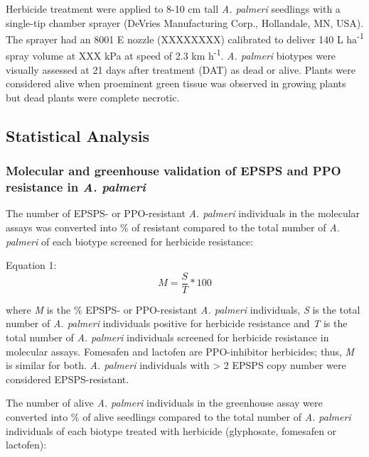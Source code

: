 \documentclass[10pt,letterpaper]{article}
\begin{document}
Herbicide treatment were applied to 8-10 cm tall \emph{A. palmeri}
seedlings with a single-tip chamber sprayer (DeVries Manufacturing
Corp., Hollandale, MN, USA). The sprayer had an 8001 E nozzle (XXXXXXXX)
calibrated to deliver 140 L ha\textsuperscript{-1} spray volume at XXX
kPa at speed of 2.3 km h\textsuperscript{-1}. \emph{A. palmeri} biotypes
were visually assessed at 21 days after treatment (DAT) as dead or
alive. Plants were considered alive when proeminent green tissue was
observed in growing plants but dead plants were complete necrotic.

\hypertarget{statistical-analysis}{%
\subsection{Statistical Analysis}\label{statistical-analysis}}

\hypertarget{molecular-and-greenhouse-validation-of-epsps-and-ppo-resistance-in-a.-palmeri}{%
\subsubsection{\texorpdfstring{Molecular and greenhouse validation of
EPSPS and PPO resistance in \emph{A.
palmeri}}{Molecular and greenhouse validation of EPSPS and PPO resistance in A. palmeri}}\label{molecular-and-greenhouse-validation-of-epsps-and-ppo-resistance-in-a.-palmeri}}

The number of EPSPS- or PPO-resistant \emph{A. palmeri} individuals in
the molecular assays was converted into \% of resistant compared to the
total number of \emph{A. palmeri} of each biotype screened for herbicide
resistance:

Equation 1: \[M=\frac{S}{T} * 100 \]

where \emph{M} is the \% EPSPS- or PPO-resistant \emph{A. palmeri}
individuals, \emph{S} is the total number of \emph{A. palmeri}
individuals positive for herbicide resistance and \emph{T} is the total
number of \emph{A. palmeri} individuals screened for herbicide
resistance in molecular assays. Fomesafen and lactofen are PPO-inhibitor
herbicides; thus, \emph{M} is similar for both. \emph{A. palmeri}
individuals with \textgreater{} 2 EPSPS copy number were considered
EPSPS-resistant.

The number of alive \emph{A. palmeri} individuals in the greenhouse
assay were converted into \% of alive seedlings compared to the total
number of \emph{A. palmeri} individuals of each biotype treated with
herbicide (glyphosate, fomesafen or lactofen):
\end{document}
